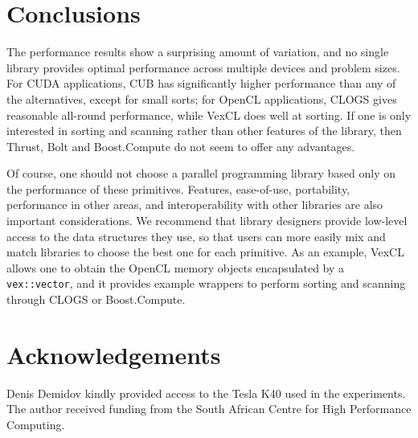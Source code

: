 \documentclass{ws-ppl}
\begin{document}
\section{Conclusions}
The performance results show a surprising amount of variation, and no single
library provides optimal performance across multiple devices and problem
sizes. For CUDA applications, CUB has significantly higher performance than
any of the alternatives, except for small sorts; for OpenCL applications,
CLOGS gives reasonable all-round performance, while VexCL does well at sorting.
If one is only interested in sorting and scanning rather than other features
of the library, then Thrust, Bolt and Boost.Compute do not seem to offer any
advantages.

Of course, one should not choose a parallel programming library based only on
the performance of these primitives. Features, ease-of-use, portability,
performance in other areas, and interoperability with other libraries are also
important considerations.
We recommend that library designers provide low-level access to the data
structures they use, so that users can more easily mix and match libraries to
choose the best one for each primitive. As an example, VexCL allows one to
obtain the OpenCL memory objects encapsulated by a \texttt{vex::vector}, and
it provides example wrappers to perform sorting and scanning through CLOGS or
Boost.Compute.

\section*{Acknowledgements}
Denis Demidov kindly provided access to the Tesla K40 used in the experiments.
The author received funding from the South African Centre for High Performance
Computing.


\end{document}
